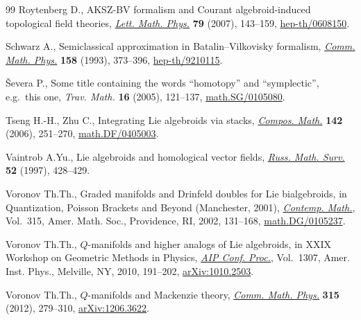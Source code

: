 \begin{thebibliography}{99}
Roytenberg D., A{KSZ}-{BV} formalism and {C}ourant algebroid-induced
  topological f\/ield theories, \href{http://dx.doi.org/10.1007/s11005-006-0134-y}{\textit{Lett. Math. Phys.}} \textbf{79} (2007),
  143--159, \href{http://arxiv.org/abs/hep-th/0608150}{hep-th/0608150}.

Schwarz A., Semiclassical approximation in {B}atalin--{V}ilkovisky formalism,
  \href{http://dx.doi.org/10.1007/BF02108080}{\textit{Comm. Math. Phys.}} \textbf{158} (1993), 373--396,
  \href{http://arxiv.org/abs/hep-th/9210115}{hep-th/9210115}.

{\v{S}}evera P., Some title containing the words ``homotopy'' and
  ``symplectic'', e.g.~this one, \textit{Trav. Math.} \textbf{16} (2005),
  121--137, \href{http://arxiv.org/abs/math.SG/0105080}{math.SG/0105080}.

Tseng H.-H., Zhu C., Integrating {L}ie algebroids via stacks, \href{http://dx.doi.org/10.1112/S0010437X05001752}{\textit{Compos.
  Math.}} \textbf{142} (2006), 251--270, \href{http://arxiv.org/abs/math.DF/0405003}{math.DF/0405003}.

Vaintrob A.Yu., Lie algebroids and homological vector f\/ields, \href{http://dx.doi.org/10.1070/RM1997v052n02ABEH001802}{\textit{Russ.
  Math. Surv.}} \textbf{52} (1997), 428--429.

Voronov Th.Th., Graded manifolds and {D}rinfeld doubles for {L}ie bialgebroids,
  in Quantization, {P}oisson Brackets and Beyond ({M}anchester, 2001),
  \href{http://dx.doi.org/10.1090/conm/315/05478}{\textit{Contemp. Math.}}, Vol.~315, Amer. Math. Soc., Providence, RI, 2002,
  131--168, \href{http://arxiv.org/abs/math.DG/0105237}{math.DG/0105237}.

Voronov Th.Th., {$Q$}-manifolds and higher analogs of {L}ie algebroids, in X{XIX}
  {W}orkshop on {G}eometric {M}ethods in {P}hysics, \href{http://dx.doi.org/10.1063/1.3527417}{\textit{AIP Conf. Proc.}},
  Vol.~1307, Amer. Inst. Phys., Melville, NY, 2010, 191--202,
  \href{http://arxiv.org/abs/1010.2503}{arXiv:1010.2503}.

Voronov Th.Th., {$Q$}-manifolds and {M}ackenzie theory, \href{http://dx.doi.org/10.1007/s00220-012-1568-y}{\textit{Comm. Math.
  Phys.}} \textbf{315} (2012), 279--310, \href{http://arxiv.org/abs/1206.3622}{arXiv:1206.3622}.

\end{thebibliography}

